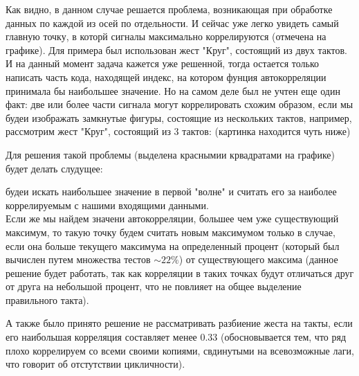 Как видно, в данном случае решается проблема, возникающая при обработке данных по каждой из осей по отдельности. И сейчас уже легко увидеть самый главную точку, в которй сигналы максимально коррелируются (отмечена на графике).
Для примера был использован жест "Круг", состоящий из двух тактов.
И на данный момент задача кажется уже решенной, тогда остается только написать часть кода, находящей индекс, на котором фунция автокорреляции принимала бы наибольшее значение.
Но на самом деле был не учтен еще один факт: две или более части сигнала могут коррелировать схожим образом, если мы будеи изображать замкнутые фигуры, состоящие из нескольких тактов, например, рассмотрим жест "Круг", состоящий из 3 тактов: (картинка находится чуть ниже)

\begin{figure}[H]
\end{figure}

Для решения такой проблемы (выделена краснымии крвадратами на графике) будет делать слудущее:

будеи искать наибольшее значение в первой "волне" и считать его за наиболее коррелируемым с нашими входящими данными. \\
Если же мы найдем значени автокорреляции, большее чем уже существующий максимум, то такую точку будем считать новым максимумом только в случае, если она больше текущего максимума на определенный процент (который был вычислен путем множества тестов $\sim 22 \%$) от существующего максима (данное решение будет работать, так как корреляции в таких точках будут отличаться друг от друга на небольшой процент, что не повлияет на общее выделение правильного такта).

А также было принято решение не рассматривать разбиение жеста на такты, если его наибольшая корреляция составляет менее 0.33 (обосновывается тем, что ряд плохо коррелируем со всеми своими копиями, свдинутыми на всевозможные лаги, что говорит об отстутствии цикличности).

